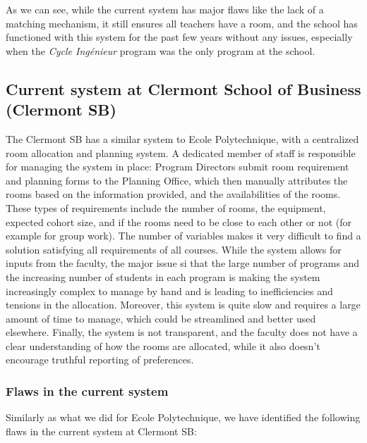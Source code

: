 \documentclass[a4paper, oneside]{article}
\begin{document}
\linebreak

\vspace{0.05cm}

As we can see, while the current system has major flaws like the lack of a matching mechanism,
it still ensures all teachers have a room, and the school has functioned with this system for the past few years without any issues,
especially when the \textit{Cycle Ingénieur} program was the only program at the school.

\subsection{Current system at Clermont School of Business (Clermont SB)}
The Clermont SB has a similar system to Ecole Polytechnique, with a centralized room allocation and planning system. A dedicated member of staff is responsible
for managing the system in place: Program Directors submit room requirement and planning forms to the Planning Office, which then manually attributes the rooms based on the information provided,
and the availabilities of the rooms. These types of requirements include the number of rooms, the equipment, expected cohort size, and if the rooms need to be close to each other or not (for example for group work).
The number of variables makes it very difficult to find a solution satisfying all requirements of all courses.
While the system allows for inputs from the faculty, the major issue si that the large number of programs and the increasing number of students in each program
is making the system increasingly complex to manage by hand and is leading to inefficiencies and tensions in the allocation. Moreover, this system is quite slow and requires
a large amount of time to manage, which could be streamlined and better used elsewhere. Finally, the system is not transparent,
and the faculty does not have a clear understanding of how the rooms are allocated, while it also doesn't encourage truthful reporting of preferences.

\subsubsection{Flaws in the current system}
Similarly as what we did for Ecole Polytechnique, we have identified the following flaws in the current system at Clermont SB:\\
\end{document}
